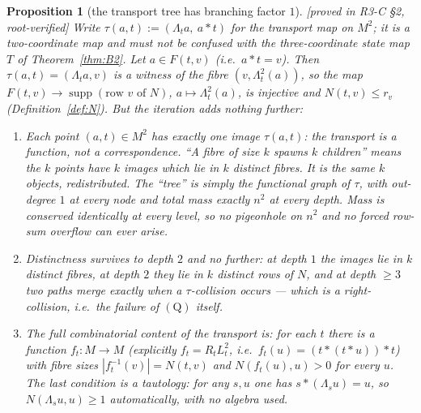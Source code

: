 \documentclass[11pt]{article}
\theoremstyle{plain}
\newtheorem{proposition}[theorem]{Proposition}
\theoremstyle{definition}
\theoremstyle{remark}
\numberwithin{equation}{section}
\newcommand{\op}{\mathbin{*}}
\newcommand{\supp}{\operatorname{supp}}
\newcommand{\statusbox}[1]{{\small\sloppy\textsf{[#1]}}}
\newcommand{\PROVED}[1]{\statusbox{proved in #1, root-verified}}
\begin{document}
\begin{proposition}[the transport tree has branching factor $1$]\label{prop:tree}
\PROVED{R3-C \S2}
Write $\tau(a,t) := (\Lambda_ta,\ a\op t)$ for the \emph{transport map} on $M^2$; it is a
two-coordinate map and must not be confused with the three-coordinate state map $T$ of
Theorem~\ref{thm:B2}.
Let $a\in F(t,v)$ (i.e.\ $a\op t = v$). Then $\tau(a,t) = (\Lambda_ta, v)$ is a witness of the
fibre $(v,\Lambda_t^2(a))$, so the map $F(t,v)\to \supp(\text{row } v\text{ of }N)$,
$a\mapsto\Lambda_t^2(a)$, is injective and $N(t,v)\le r_v$ (Definition~\ref{def:N}). But the
iteration
adds nothing further:
\begin{enumerate}
\item[(a)] Each \emph{point} $(a,t)\in M^2$ has exactly one image $\tau(a,t)$: the transport
is a
function, not a correspondence. ``A fibre of size $k$ spawns $k$ children'' means the $k$
points have $k$ images which lie in $k$ distinct fibres. It is the same $k$ objects,
redistributed. The ``tree'' is simply the functional graph of $\tau$, with out-degree $1$ at
every
node and total mass exactly $n^2$ at every depth. \emph{Mass is conserved identically at every
level}, so no pigeonhole on $n^2$ and no forced row-sum overflow can ever arise.
\item[(b)] Distinctness survives to depth $2$ and no further: at depth $1$ the images lie in
$k$ distinct fibres, at depth $2$ they lie in $k$ distinct \emph{rows} of $N$, and at depth
$\ge 3$ two paths merge exactly when a $\tau$-collision occurs --- which is a right-collision,
i.e.\ the failure of $(\mathrm{Q})$ itself.
\item[(c)] The full combinatorial content of the transport is: for each $t$ there is a
function $f_t : M\to M$ (explicitly $f_t = R_tL_t^2$, i.e.\
$f_t(u) = (t\op(t\op u))\op t$) with fibre sizes $|f_t^{-1}(v)| = N(t,v)$ and
$N(f_t(u),u)>0$ for every $u$. The last condition is a \emph{tautology}: for any $s,u$ one has
$s\op(\Lambda_su) = u$, so $N(\Lambda_su,u)\ge1$ automatically, with no algebra used.
\end{enumerate}
\end{proposition}
\end{document}
